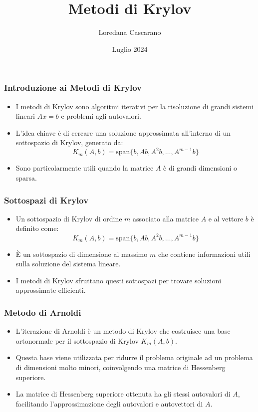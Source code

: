\documentclass{beamer}
\title{Metodi di Krylov}
\author{Loredana Cascarano}
\date{Luglio 2024}
\begin{document}
\begin{frame}
\titlepage
\end{frame}

\begin{frame}
\frametitle{Introduzione ai Metodi di Krylov}
\begin{itemize}
\item I metodi di Krylov sono algoritmi iterativi per la risoluzione di grandi sistemi lineari \(Ax = b\) e problemi agli autovalori.
\item L'idea chiave è di cercare una soluzione approssimata all'interno di un sottospazio di Krylov, generato da:
\[ K_m(A, b) = \text{span}\{b, Ab, A^2b, \ldots, A^{m-1}b\} \]
\item Sono particolarmente utili quando la matrice \(A\) è di grandi dimensioni o sparsa.
\end{itemize}
\end{frame}

\begin{frame}
\frametitle{Sottospazi di Krylov}
\begin{itemize}
\item Un sottospazio di Krylov di ordine \(m\) associato alla matrice \(A\) e al vettore \(b\) è definito come:
\[ K_m(A, b) = \text{span}\{b, Ab, A^2b, \ldots, A^{m-1}b\} \]
\item È un sottospazio di dimensione al massimo \(m\) che contiene informazioni utili sulla soluzione del sistema lineare.
\item I metodi di Krylov sfruttano questi sottospazi per trovare soluzioni approssimate efficienti.
\end{itemize}
\end{frame}

\begin{frame}
\frametitle{Metodo di Arnoldi}
\begin{itemize}
\item L'iterazione di Arnoldi è un metodo di Krylov che costruisce una base ortonormale per il sottospazio di Krylov \(K_m(A, b)\).
\item Questa base viene utilizzata per ridurre il problema originale ad un problema di dimensioni molto minori, coinvolgendo una matrice di Hessenberg superiore.
\item La matrice di Hessenberg superiore ottenuta ha gli stessi autovalori di \(A\), facilitando l'approssimazione degli autovalori e autovettori di \(A\).
\end{itemize}
\end{frame}
\end{document}
